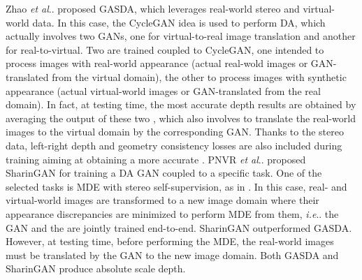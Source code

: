 \documentclass[journal]{IEEEtran}
\makeatletter
\DeclareRobustCommand\onedot{\futurelet\@let@token\@onedot}
\def\@onedot{\ifx\@let@token.\else.\null\fi\xspace}
\def\ie{\emph{i.e}\onedot} \def\Ie{\emph{I.e}\onedot}
\def\etal{\emph{et al}\onedot}
\makeatother
\begin{document}
Zhao {\etal} \cite{Zhao:2019GASDA} proposed GASDA, which leverages real-world stereo and virtual-world data. In this case, the CycleGAN idea \cite{Zhu:2017} is used to perform DA, which actually involves two GANs, one for virtual-to-real image translation and another for real-to-virtual. Two  are trained coupled to CycleGAN, one intended to process images with real-world appearance (actual real-wold images or GAN-translated from the virtual domain), the other to process images with synthetic appearance (actual virtual-world images or GAN-translated from the real domain). In fact, at testing time, the most accurate depth results are obtained by averaging the output of these two , which also involves to translate the real-world images to the virtual domain by the corresponding GAN. Thanks to the stereo data, left-right depth and geometry consistency losses are also included during training aiming at obtaining a more accurate . PNVR {\etal} \cite{Pnvr:2020SharinGAN} proposed SharinGAN for training a DA GAN coupled to a specific task. One of the selected tasks is MDE with stereo self-supervision, as in \cite{Zhao:2019GASDA}. In this case, real- and virtual-world images are transformed to a new image domain where their appearance discrepancies are minimized to perform MDE from them, {\ie} the GAN and the   are jointly trained end-to-end. SharinGAN outperformed GASDA. However, at testing time, before performing the MDE, the real-world images must be translated by the GAN to the new image domain. Both GASDA and SharinGAN produce absolute scale depth.
\end{document}
